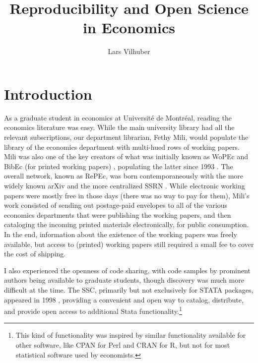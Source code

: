 \documentclass{article}
\author[1]{Lars Vilhuber}
\affil[1]{Cornell University}
\title{Reproducibility and Open Science in Economics}
\begin{document}
\maketitle

\section{Introduction}


As a graduate student in economics at Université de Montréal, reading the economics literature was  easy. While the main university library had all the relevant subscriptions, our department librarian, Fethy Mili, would populate the library of the economics department with multi-hued rows of working papers. Mili was also one of the key creators of what was initially known as \ac{WoPEc} and BibEc (for printed working papers) \citep{krichel_wopec_1997,cruz_cataloging_2000,krichel_economics_2009}, populating the latter since 1993 \citep[][p. 450]{batizlazo_brief_2012}. The overall network, known as \ac{RePEc}, was born contemporaneously with the more widely known arXiv \citep{ginsparg_it_2011} and the more centralized \ac{SSRN} \citep{noauthor_social_2025}. While electronic working papers were mostly free in those days (there was no way to pay for them), Mili's work consisted of sending out postage-paid envelopes to all of the various economics departments that were publishing the working papers, and then cataloging the incoming printed materials electronically, for public consumption. In the end, information about the existence of the working papers was freely available, but access to (printed) working papers still required a small fee to cover the cost of shipping.

I also experienced the openness of code sharing, with code samples by prominent authors being available to graduate students, though discovery was much more difficult at the time.  The \ac{SSC}, primarily but not exclusively for STATA packages, appeared in 1998 \citep{cox_conversation_2010,cox_stata_2022}, providing a convenient and open way to catalog, distribute, and provide open access to additional Stata functionality.\footnote{This kind of functionality was inspired by similar functionality  available for other software, like CPAN for Perl and CRAN for R, but not for most statistical software used by economists.}
\end{document}
